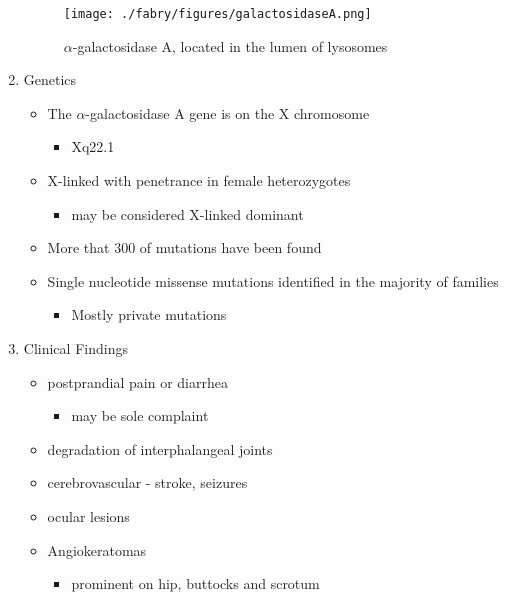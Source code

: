 \documentclass{scrartcl}
\begin{document}
\begin{enumerate}
\begin{figure}[htbp]
\centering
\texttt{[image: ./fabry/figures/galactosidaseA.png]}
\caption[\(\alpha\)-galactosidase A]{\label{fig:org5984960}
\(\alpha\)-galactosidase A, located in the lumen of lysosomes}
\end{figure}

\item Genetics
\label{sec:org861f96b}
\begin{itemize}
\item The \(\alpha\)-galactosidase A gene is on the X chromosome
\begin{itemize}
\item Xq22.1
\end{itemize}
\item X-linked with penetrance in female heterozygotes
\begin{itemize}
\item may be considered X-linked dominant
\end{itemize}
\item More that 300 of mutations have been found
\item Single nucleotide missense mutations identified in the majority of families
\begin{itemize}
\item Mostly private mutations
\end{itemize}
\end{itemize}

\item Clinical Findings
\label{sec:orgb7ca0f0}

\begin{itemize}
\item postprandial pain or diarrhea
\begin{itemize}
\item may be sole complaint
\end{itemize}
\item degradation of interphalangeal joints
\item cerebrovascular - stroke, seizures
\item ocular lesions
\item Angiokeratomas
\begin{itemize}
\item prominent on hip, buttocks and scrotum
\end{itemize}
\end{itemize}


\end{enumerate}
\end{document}
